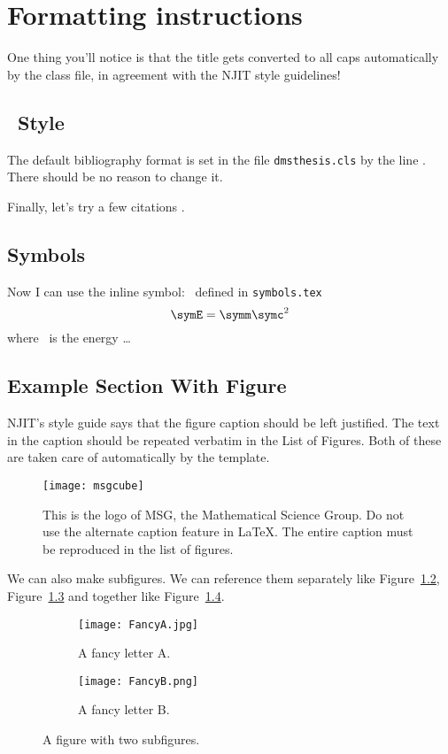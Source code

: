 \chapter{Formatting instructions}
\label{ch:formatting}

One thing you'll notice is that the title gets converted to all caps automatically by the class file, in agreement with the NJIT style guidelines!

\section{\BibTeX\ Style}

The default bibliography format is set in the file \texttt{dmsthesis.cls} by the line \verb++. There should be no reason to change it.

Finally, let's try a few citations \cite{ALBERTSETAL:1994,FERSHT:1985,FISCHER:1987a,KAUFFMAN:1969,MR1191182,MR1617060}. 

\section{Symbols}
\opensymdef
{}
\closesymdef

Now I can use the inline symbol: \symE\ defined in \texttt{symbols.tex} \[\symE=\symm \symc^2\] where
\symE\ is the energy \ldots

\section{Example Section With Figure}

NJIT's style guide says that the figure caption should be left justified. The text in the caption should be repeated verbatim in the List of Figures. Both of these are taken care of automatically by the template.

\begin{figure}[htbp]
\centering
\texttt{[image: msgcube]}
\caption{This is the logo of MSG, the Mathematical Science Group. Do not use the alternate caption feature in \LaTeX. The entire caption must be reproduced in the list of figures.}
\label{fig:1}
\end{figure}


We can also make subfigures. We can reference them separately like Figure~\ref{fig:first}, Figure~\ref{fig:second} and together like Figure~\ref{fig:doublefigure}.
\begin{figure}
\centering
\begin{subfigure}{0.4\textwidth}
    \texttt{[image: FancyA.jpg]}
    \caption{A fancy letter A.}
    \label{fig:first}
\end{subfigure}
\hfill
\begin{subfigure}{0.4\textwidth}
    \texttt{[image: FancyB.png]}
    \caption{A fancy letter B.}
    \label{fig:second}
\end{subfigure}
\caption{A figure with two subfigures.}
\label{fig:doublefigure}
\end{figure}

